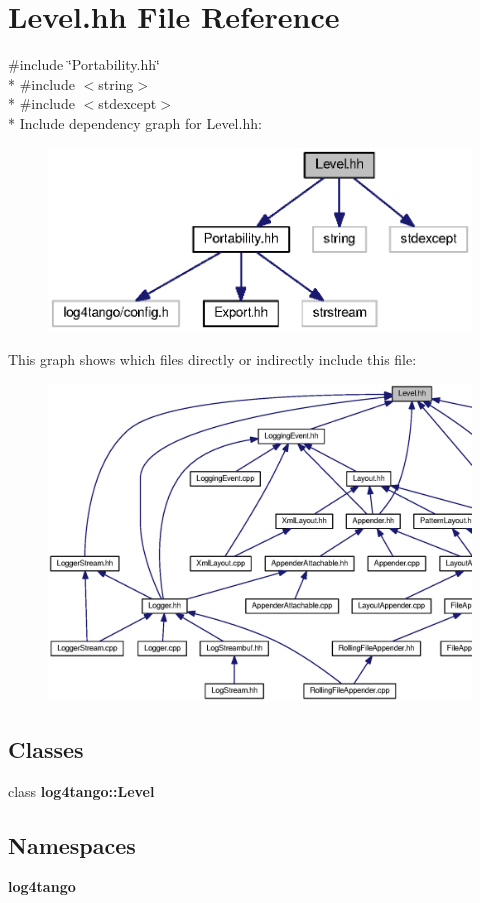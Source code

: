 \section{Level.\-hh File Reference}
\label{Level_8hh}
{\ttfamily \#include \char`\"{}Portability.\-hh\char`\"{}}\\*
{\ttfamily \#include $<$string$>$}\\*
{\ttfamily \#include $<$stdexcept$>$}\\*
Include dependency graph for Level.\-hh\-:
\nopagebreak
\begin{figure}[H]
\begin{center}
\leavevmode
\includegraphics[width=350pt]{d4/d3a/Level_8hh__incl}
\end{center}
\end{figure}
This graph shows which files directly or indirectly include this file\-:
\nopagebreak
\begin{figure}[H]
\begin{center}
\leavevmode
\includegraphics[width=350pt]{dd/df4/Level_8hh__dep__incl}
\end{center}
\end{figure}
\subsection*{Classes}
\begin{DoxyCompactItemize}
\item 
class {\bf log4tango\-::\-Level}
\end{DoxyCompactItemize}
\subsection*{Namespaces}
\begin{DoxyCompactItemize}
\item 
{\bf log4tango}
\end{DoxyCompactItemize}
